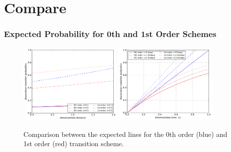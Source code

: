 \documentclass[slidestop, compress, mathserif]{beamer}
\begin{document}
\section{Compare}
\begin{frame}
  \frametitle{Expected Probability for 0th and 1st Order Schemes}
  \begin{figure}
    \centering
    \includegraphics[width=0.45\textwidth]{../compare_dissociation_transition_probability_order.pdf}
    \includegraphics[width=0.45\textwidth]{../compare_dissociation_transition_probability_order_tdist.pdf}
    \caption{Comparison between the expected lines for the 0th order (blue) and 1st order (red) transition scheme.}
  \end{figure}
\end{frame}
\end{document}

